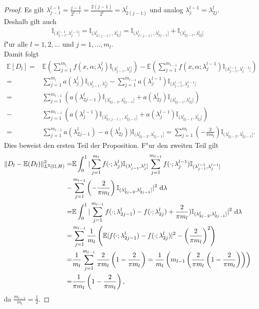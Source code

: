 \begin{proof}
Es gilt $\lambda_{j-1}^{l-1}=\frac{j-1}{2^{l-1}}=\frac{2(j-1)}{2^l}=\lambda^l_{2(j-1)}$ und analog $\lambda_j^{l-1}=\lambda_{2j}^l$.\\
Deshalb gilt auch 
\begin{align*}
\mathbb{I}_{(\lambda_{j-1}^{l-1},\lambda_j^{l-1}]}=\mathbb{I}_{(\lambda_{2(j-1)}^{l},\lambda_{2j}^{l}]}=\mathbb{I}_{(\lambda_{2(j-1)}^{l},\lambda_{2j-1}^{l}]}+\mathbb{I}_{(\lambda_{2j-1}^{l},\lambda_{2j}^{l}]} 
\end{align*}
f"ur alle $ l=1,2,...$ und $ j=1,...,m_l$.\\
Damit folgt
\begin{align*}
\mathbb{E}[D_l]=&\mathbb{E}\left(\sum_{j=1}^{m_l}f(x,\alpha;\lambda_j^l)\mathbb{I}_{(\lambda_{j-1}^{l},\lambda_j^{l}]}\right)-\mathbb{E}\left(\sum_{j=1}^{m_{l-1}}f(x,\alpha;\lambda_j^{l-1})\mathbb{I}_{(\lambda_{j-1}^{l-1},\lambda_j^{l-1}]}\right)\\=&\sum_{j=1}^{m_l}a(\lambda_j^l)\mathbb{I}_{(\lambda_{j-1}^{l},\lambda_j^{l}]}-\sum_{j=1}^{m_{l-1}}a(\lambda_j^{l-1})\mathbb{I}_{(\lambda_{j-1}^{l-1},\lambda_j^{l-1}]}\\=&\sum_{j=1}^{m_{l-1}}\left(a(\lambda_{2j-1}^l)\mathbb{I}_{(\lambda_{2j-2}^{l},\lambda_{2j-1}^{l}]}+a(\lambda_{2j}^l)\mathbb{I}_{(\lambda_{2j-1}^{l},\lambda_{2j}^{l}]}\right)\\-&\sum_{j=1}^{m_{l-1}}\left(a(\lambda_{j}^{l-1})\mathbb{I}_{(\lambda_{2(j-1)}^{l},\lambda_{2j-1}^{l}]}+a(\lambda_{j}^{l-1})\mathbb{I}_{(\lambda_{2j-1}^{l},\lambda_{2j}^{l}]}\right)\\=& \sum_{j=1}^{m_{l-1}}a(\lambda_{2j-1}^l)-a(\lambda_{2j}^l))\mathbb{I}_{(\lambda^l_{2j-2},\lambda^l_{2j-1}]}=\sum_{j=1}^{m_l}\left(-\frac{2}{\pi m_l}\right)\mathbb{I}_{(\lambda^l_{2j-2},\lambda^l_{2j-1}]}.
\end{align*}
Dies beweist den ersten Teil der Proposition. F"ur den zweiten Teil gilt
\allowdisplaybreaks
\begin{align*}
\|D_l-\mathbb{E}(D_l)\|^2_{L^2(\Omega,H)}
=&\mathbb{E}
\int_0^1|\sum_{j=1}^{m_l}
f(\cdot;\lambda_j^l)\mathbb{I}_{(\lambda_{j-1}^l,\lambda_j^l]}
\sum_{j=1}^{m_{l-1}}f(\cdot;\lambda_j^{l-1})\mathbb{I}_{(\lambda_{j-1}^{l-1},\lambda_j^{l-1}]}\\
-&\sum_{j=1}^{m_{l-1}}\left(-\frac{2}{\pi m_l}\right)\mathbb{I}_{(\lambda^l_{2j-2},\lambda^l_{2j-1}]}|^2\text{ d} \lambda\\
=&\mathbb{E}\int_0^1|\sum_{j=1}^{m_{l-1}}f(\cdot;\lambda_{2j-1}^{l})-f(\cdot;\lambda_{2j}^{l})+\frac{2}{\pi m_l})\mathbb{I}_{(\lambda^l_{2j-2},\lambda^l_{2j-1}]}|^2\text{ d} \lambda\\
=& \sum_{j=1}^{m_{l-1}}\frac{1}{m_l}\left(\mathbb{E}|f(\cdot;\lambda^l_{2j-1})-f(\cdot;\lambda_{2j}^l)|^2-\left(\frac{2}{\pi m_l}\right)^2\right)\\
=&\frac{1}{m_l}\sum_{j=1}^{m_{l-1}}\frac{2}{\pi m_l}\left(1-\frac{2}{\pi m_l}\right)=\frac{1}{m_l}\left(m_{l-1}\left(\frac{2}{\pi m_l}\left(1-\frac{2}{\pi m_l}\right)\right)\right)
\\=&
\frac{1}{\pi m_l}\left(1-\frac{2}{\pi m_l}\right),
\end{align*}
da $\frac{m_{l-1}}{m_l}=\frac{1}{2}$.
\end{proof}

